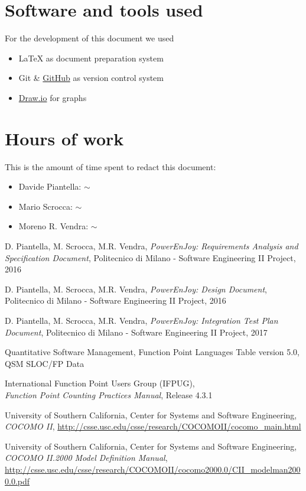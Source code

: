 \begin{appendices}

	\section{Software and tools used}
	For the development of this document we used
	\begin{itemize}
		\item \LaTeX{} as document preparation system
		\item Git \& \href{http://github.com}{GitHub} as version control system
		\item \href{http://draw.io}{Draw.io} for graphs 
	\end{itemize}
	
	\section{Hours of work}
	This is the amount of time spent to redact this document:
	\begin{itemize}
		\item Davide Piantella: $\sim$ 
		\item Mario Scrocca: $\sim$ 
		\item Moreno R. Vendra: $\sim$ 
	\end{itemize}
	
\end{appendices}


\begin{thebibliography}{9}

D. Piantella, M. Scrocca, M.R. Vendra, \emph{PowerEnJoy: Requirements Analysis and Specification Document}, Politecnico di Milano - Software Engineering II Project, 2016

D. Piantella, M. Scrocca, M.R. Vendra, \emph{PowerEnJoy: Design Document}, Politecnico di Milano - Software Engineering II Project, 2016

D. Piantella, M. Scrocca, M.R. Vendra, \emph{PowerEnJoy: Integration Test Plan Document}, Politecnico di Milano - Software Engineering II Project, 2017

Quantitative Software Management, Function Point Languages Table version 5.0, QSM SLOC/FP Data

International Function Point Users Group (IFPUG),
\\\emph{Function Point Counting Practices Manual}, Release 4.3.1 

University of Southern California, Center for Systems and Software Engineering, \emph{COCOMO II}, \url{http://csse.usc.edu/csse/research/COCOMOII/cocomo_main.html}

University of Southern California, Center for Systems and Software Engineering, \emph{COCOMO II.2000 Model Definition Manual}, \url{http://csse.usc.edu/csse/research/COCOMOII/cocomo2000.0/CII_modelman2000.0.pdf}

\end{thebibliography}